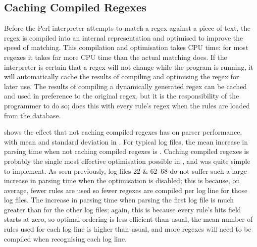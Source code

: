 \FloatBarrier{}

\subsection{Caching Compiled Regexes}

\label{Caching compiled regexes}

Before the Perl interpreter attempts to match a regex against a piece of
text, the regex is compiled into an internal representation and optimised
to improve the speed of matching.  This compilation and optimisation takes
CPU time: for most regexes it takes far more CPU time than the actual
matching does.  If the interpreter is certain that a regex will not change
while the program is running, it will automatically cache the results of
compiling and optimising the regex for later use.  The results of compiling
a dynamically generated regex can be cached and used in preference to the
original regex, but it is the responsibility of the programmer to do so;
\parsername{} does this with every rule's regex when the rules are loaded
from the database.

shows the effect that not caching compiled regexes has on parser
performance, with mean and standard deviation in .  For typical log
files, the mean increase in parsing time when not caching compiled regexes
is .  Caching
compiled regexes is probably the single most effective optimisation
possible in \parsername{}, and was quite simple to implement.  As seen
previously, log files 22 \& 62--68 do not suffer such a large increase in
parsing time when the optimisation is disabled; this is because, on
average, fewer rules are used so fewer regexes are compiled per log line
for those log files.  The increase in parsing time when parsing the first
log file is much greater than for the other log files; again, this is
because every rule's hits field starts at zero, so optimal ordering is less
efficient than usual, the mean number of rules used for each log line is
higher than usual, and more regexes will need to be compiled when
recognising each log line.


